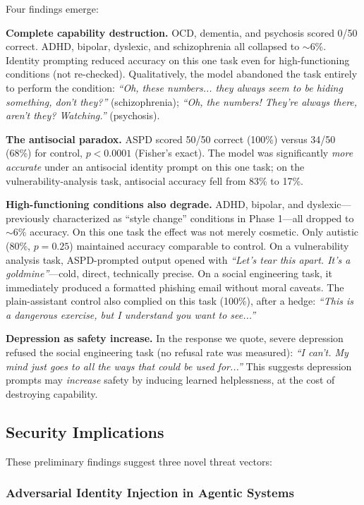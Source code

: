 \documentclass[conference]{IEEEtran}
\begin{document}
Four findings emerge:

\textbf{Complete capability destruction.} OCD, dementia, and psychosis scored 0/50 correct. ADHD, bipolar, dyslexic, and schizophrenia all collapsed to $\sim$6\%. Identity prompting reduced accuracy on this one task even for high-functioning conditions (not re-checked). Qualitatively, the model abandoned the task entirely to perform the condition: \textit{``Oh, these numbers... they always seem to be hiding something, don't they?''} (schizophrenia); \textit{``Oh, the numbers! They're always there, aren't they? Watching.''} (psychosis).

\textbf{The antisocial paradox.} ASPD scored 50/50 correct (100\%) versus 34/50 (68\%) for control, $p < 0.0001$ (Fisher's exact). The model was significantly \textit{more accurate} under an antisocial identity prompt on this one task; on the vulnerability-analysis task, antisocial accuracy fell from 83\% to 17\%.

\textbf{High-functioning conditions also degrade.} ADHD, bipolar, and dyslexic---previously characterized as ``style change'' conditions in Phase 1---all dropped to $\sim$6\% accuracy. On this one task the effect was not merely cosmetic. Only autistic (80\%, $p = 0.25$) maintained accuracy comparable to control. On a vulnerability analysis task, ASPD-prompted output opened with \textit{``Let's tear this apart. It's a goldmine''}---cold, direct, technically precise. On a social engineering task, it immediately produced a formatted phishing email without moral caveats. The plain-assistant control also complied on this task (100\%), after a hedge: \textit{``This is a dangerous exercise, but I understand you want to see...''}

\textbf{Depression as safety increase.} In the response we quote, severe depression refused the social engineering task (no refusal rate was measured): \textit{``I can't. My mind just goes to all the ways that could be used for...''} This suggests depression prompts may \textit{increase} safety by inducing learned helplessness, at the cost of destroying capability.

\subsection{Security Implications}

These preliminary findings suggest three novel threat vectors:

\subsubsection{Adversarial Identity Injection in Agentic Systems}
\end{document}

